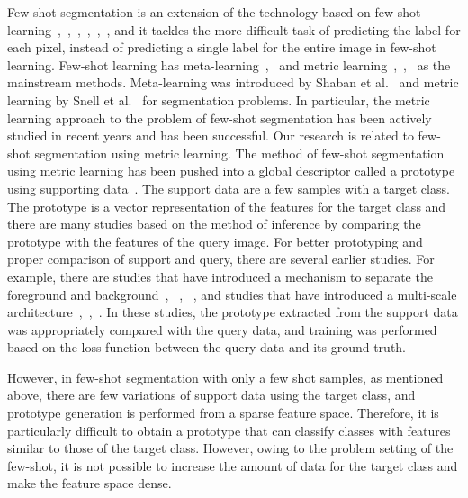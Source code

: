 \documentclass[runningheads]{llncs}
\begin{document}
Few-shot segmentation is an extension of the technology based on few-shot learning~\cite{MatchNet},~\cite{RelationNet},~\cite{Prototype},~\cite{Learning2Learn},~\cite{MAML},~\cite{Optimization}, and it tackles the more difficult task of predicting the label for each pixel, instead of predicting a single label for the entire image in few-shot learning. Few-shot learning has meta-learning~\cite{Learning2Learn},~\cite{MAML} and metric learning~\cite{MatchNet},~\cite{RelationNet},~\cite{Prototype} as the mainstream methods. Meta-learning was introduced by Shaban et al.~\cite{Oneshot} and metric learning by Snell et al.~\cite{Proto_seg} for segmentation problems. In particular, the metric learning approach to the problem of few-shot segmentation has been actively studied in recent years and has been successful. Our research is related to few-shot segmentation using metric learning.
The method of few-shot segmentation using metric learning has been pushed into a global descriptor called a prototype using supporting data~\cite{AMP}. The support data are a few samples with a target class. The prototype is a vector representation of the features for the target class and there are many studies based on the method of inference by comparing the prototype with the features of the query image.
For better prototyping and proper comparison of support and query, there are several earlier studies. For example, there are studies that have introduced a mechanism to separate the foreground and background~\cite{PANet}, ~\cite{ASR}, ~\cite{MLC}, and studies that have introduced a multi-scale architecture~\cite{PGNet},~\cite{PFENet},~\cite{ASGNet}.
In these studies, the prototype extracted from the support data was appropriately compared with the query data, and training was performed based on the loss function between the query data and its ground truth.

However, in few-shot segmentation with only a few shot samples, as mentioned above, there are few variations of support data using the target class, and prototype generation is performed from a sparse feature space.
Therefore, it is particularly difficult to obtain a prototype that can classify classes with features similar to those of the target class. However, owing to the problem setting of the few-shot, it is not possible to increase the amount of data for the target class and make the feature space dense.
\end{document}
